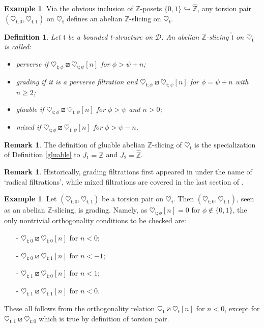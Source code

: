 \documentclass{article}
\newtheorem{defn}[thm]{Definition}
\theoremstyle{definition}
\newtheorem{exmp}[thm]{Example}
\newtheorem{rem}[thm]{Remark}
\newcommand{\Z}{\mathbb{Z}}
\newcommand{\tee}{\mathfrak{t}}
\newcommand{\orth}{\boxslash}
\begin{document}
\begin{exmp}
Via the obvious inclusion of $\Z$-posets $\{0,1\}\hookrightarrow\hat{\Z}$, any torsion pair $(\heartsuit_{\tee;0},\heartsuit_{\tee;1})$ on $\heartsuit_{\mathfrak{t}}$ defines an abelian $\Z$-slicing on $\heartsuit_{\mathfrak{t}}$.
\end{exmp}
\begin{defn}
Let $\mathfrak{t}$ be a bounded t-structure on $\mathscr{D}$. An abelian $\mathbb{Z}$-slicing $\hat{\tee}$ on $\heartsuit_{\mathfrak{t}}$ is called:
\begin{itemize}
\item \emph{perverse %
} if $\heartsuit_{\tee;\phi}\orth\heartsuit_{\tee;\psi}[n]$ for $\phi>\psi+n$; 
\item \emph{grading %
} if it is a perverse filtration and $\heartsuit_{\tee;\phi }\orth \heartsuit_{\tee;\psi}[n]$ for $\phi=\psi+n$ with $n\geq 2$; 
\item \emph{gluable} if $\heartsuit_{\tee;\phi}\orth \heartsuit_{\tee;\psi}[n]$ %
for $\phi>\psi$ and $n>0$;
\item \emph{mixed %
} if $\heartsuit_{\tee;\phi }\orth\heartsuit_{\tee;\psi}[n]$ for $ \phi > \psi -n$.  
\end{itemize} 
\end{defn}
\begin{rem}
The definition of gluable abelian $\Z$-slicing of $\heartsuit_\tee$ is the specialization of Definition \ref{gluable} to $J_1=\Z$ and $J_2=\hat{\Z}$.
\end{rem}
\begin{rem}
Historically, grading filtrations first appeared in \cite{ekh} under the name of `radical filtrations', while mixed filtrations are covered in the last section of \cite{kos}.
\end{rem}
\begin{exmp}
Let  $(\heartsuit_{\tee;0},\heartsuit_{\tee;1})$ be a torsion pair on $\heartsuit_{\mathfrak{t}}$. Then $(\heartsuit_{\tee;0},\heartsuit_{\tee;1})$, seen as an abelian $\Z$-slicing, is grading. Namely, as $\heartsuit_{\tee;\phi}[n]=0$ for $\phi \notin\{ 0,1\}$, the only nontrivial orthogonality conditions to be checked are:
\begin{itemize}
\item[-] $\heartsuit_{\tee;0}\orth\heartsuit_{\tee;0}[n]$ for $n<0$;
\item[-] $\heartsuit_{\tee;0}\orth\heartsuit_{\tee;1}[n]$ for $n<-1$;
\item[-] $\heartsuit_{\tee;1}\orth\heartsuit_{\tee;0}[n]$ for $n<1$;
\item[-] $\heartsuit_{\tee;1}\orth\heartsuit_{\tee;1}[n]$ for $n<0$.
\end{itemize}
These all follows from the orthogonality relation $\heartsuit_{\tee}\orth \heartsuit_\tee[n]$ for $n< 0$, except for $\heartsuit_{\tee;1}\orth\heartsuit_{\tee;0}$ which is true by definition of torsion pair.
\end{exmp}
\end{document}
